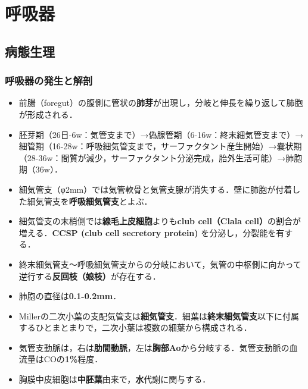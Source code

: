

\section{呼吸器}
\subsection{病態生理}
\subsubsection{呼吸器の発生と解剖}
\begin{itemize}
\item 前腸（foregut）の腹側に管状の\textbf{肺芽}が出現し，分岐と伸長を繰り返して肺胞が形成される．
\item 胚芽期（26日-6w：気管支まで）→偽腺管期（6-16w：終末細気管支まで）→細管期（16-28w：呼吸細気管支まで，サーファクタント産生開始）→嚢状期（28-36w：間質が減少，サーファクタント分泌完成，胎外生活可能）→肺胞期（36w）．
\item 細気管支（φ2mm）では気管軟骨と気管支腺が消失する．壁に肺胞が付着した細気管支を\textbf{呼吸細気管支}とよぶ．
\item 細気管支の末梢側では\textbf{線毛上皮細胞}よりも\textbf{club cell（Clala cell）}の割合が増える．\textbf{CCSP (club cell secretory protein) }を分泌し，分裂能を有する．
\item 終末細気管支〜呼吸細気管支からの分岐において，気管の中枢側に向かって逆行する\textbf{反回枝（娘枝）}が存在する．
\item 肺胞の直径は\textbf{0.1-0.2mm}．
\item Millerの二次小葉の支配気管支は\textbf{細気管支}．細葉は\textbf{終末細気管支}以下に付属するひとまとまりで，二次小葉は複数の細葉から構成される．
\item 気管支動脈は，右は\textbf{肋間動脈}，左は\textbf{胸部Ao}から分岐する．気管支動脈の血流量はCOの\textbf{1\%}程度．
\item 胸膜中皮細胞は\textbf{中胚葉}由来で，\textbf{水}代謝に関与する．



\end{itemize}


